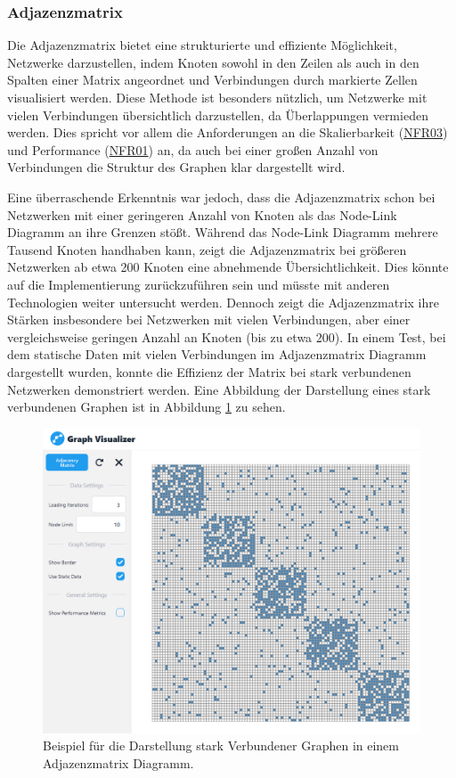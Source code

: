\subsubsection{Adjazenzmatrix}

Die Adjazenzmatrix bietet eine strukturierte und effiziente Möglichkeit, Netzwerke darzustellen, indem Knoten sowohl in den Zeilen als auch in den Spalten einer Matrix angeordnet und Verbindungen durch markierte Zellen visualisiert werden. Diese Methode ist besonders nützlich, um Netzwerke mit vielen Verbindungen übersichtlich darzustellen, da Überlappungen vermieden werden. Dies spricht vor allem die Anforderungen an die Skalierbarkeit (\hyperref[NFR03]{NFR03}) und Performance (\hyperref[NFR01]{NFR01}) an, da auch bei einer großen Anzahl von Verbindungen die Struktur des Graphen klar dargestellt wird.

Eine überraschende Erkenntnis war jedoch, dass die Adjazenzmatrix schon bei Netzwerken mit einer geringeren Anzahl von Knoten als das Node-Link Diagramm an ihre Grenzen stößt. Während das Node-Link Diagramm mehrere Tausend Knoten handhaben kann, zeigt die Adjazenzmatrix bei größeren Netzwerken ab etwa 200 Knoten eine abnehmende Übersichtlichkeit. Dies könnte auf die Implementierung zurückzuführen sein und müsste mit anderen Technologien weiter untersucht werden. Dennoch zeigt die Adjazenzmatrix ihre Stärken insbesondere bei Netzwerken mit vielen Verbindungen, aber einer vergleichsweise geringen Anzahl an Knoten (bis zu etwa 200). In einem Test, bei dem statische Daten mit vielen Verbindungen im Adjazenzmatrix Diagramm dargestellt wurden, konnte die Effizienz der Matrix bei stark verbundenen Netzwerken demonstriert werden. Eine Abbildung der Darstellung eines stark verbundenen Graphen ist in Abbildung \ref{fig:realization:comparison:AdjacencyViewHighlyConnected} zu sehen.

\begin{figure}[h]
    \centering
    \includegraphics[height=.8\textwidth]{images/03/AdjacencyViewHighlyConnected.png}
    \caption{Beispiel für die Darstellung stark Verbundener Graphen in einem Adjazenzmatrix Diagramm.}
    \label{fig:realization:comparison:AdjacencyViewHighlyConnected}
\end{figure}

